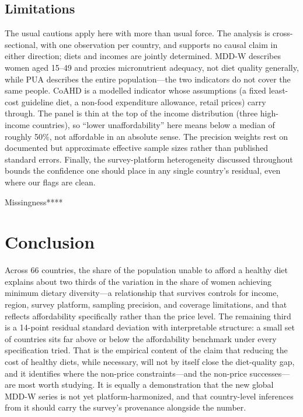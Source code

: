 \documentclass[11pt]{article}
\begin{document}
\subsection{Limitations}
The usual cautions apply here with more than usual force. The analysis is cross-sectional, with one observation per country, and supports no causal claim in either direction; diets and incomes are jointly determined. MDD-W describes women aged 15--49 and proxies micronutrient adequacy, not diet quality generally, while PUA describes the entire population---the two indicators do not cover the same people. CoAHD is a modelled indicator whose assumptions (a fixed least-cost guideline diet, a non-food expenditure allowance, retail prices) carry through. The panel is thin at the top of the income distribution (three high-income countries), so ``lower unaffordability'' here means below a median of roughly 50\%, not affordable in an absolute sense. The precision weights rest on documented but approximate effective sample sizes rather than published standard errors. Finally, the survey-platform heterogeneity discussed throughout bounds the confidence one should place in any single country's residual, even where our flags are clean.

Missingness****

\section{Conclusion}\label{sec:conclusion}

Across 66 countries, the share of the population unable to afford a healthy diet explains about two thirds of the variation in the share of women achieving minimum dietary diversity---a relationship that survives controls for income, region, survey platform, sampling precision, and coverage limitations, and that reflects affordability specifically rather than the price level. The remaining third is a 14-point residual standard deviation with interpretable structure: a small set of countries sits far above or below the affordability benchmark under every specification tried. That is the empirical content of the claim that reducing the cost of healthy diets, while necessary, will not by itself close the diet-quality gap, and it identifies where the non-price constraints---and the non-price successes---are most worth studying. It is equally a demonstration that the new global MDD-W series is not yet platform-harmonized, and that country-level inferences from it should carry the survey's provenance alongside the number.
\end{document}
